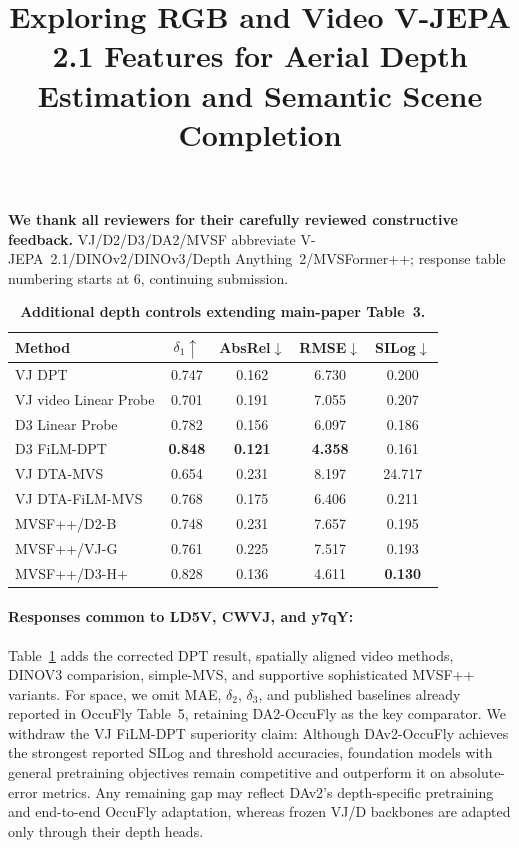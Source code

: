 \documentclass[10pt,twocolumn,letterpaper]{article}
\begin{document}
\title{Exploring RGB and Video V-JEPA 2.1 Features for Aerial Depth Estimation and Semantic Scene Completion}
\maketitle
\thispagestyle{empty}
\appendix

\noindent\textbf{We thank all reviewers for their carefully reviewed constructive feedback.}
VJ/D2/D3/DA2/MVSF abbreviate V-JEPA~2.1/DINOv2/DINOv3/Depth Anything~2/MVSFormer++;
response table numbering starts at 6, continuing submission.
\begin{table}[t]
  \centering
  \caption{\textbf{Additional depth controls extending main-paper Table~3.}}
  \label{tab:depth_evaluation}
  \footnotesize
  \setlength{\tabcolsep}{2.5pt}
  \begin{tabular}{@{}lcccc@{}}
    \toprule
    Method & $\delta_1\uparrow$ & AbsRel$\downarrow$ & RMSE$\downarrow$ & SILog$\downarrow$ \\
    \midrule
    VJ DPT          & 0.747 & 0.162 & 6.730 & 0.200 \\
    VJ video Linear Probe              & 0.701 & 0.191 & 7.055 & 0.207 \\
    D3 Linear Probe                    & 0.782 & 0.156 & 6.097 & 0.186 \\
    D3 FiLM-DPT              & \textbf{0.848} & \textbf{0.121} & \textbf{4.358} & 0.161 \\
    VJ DTA-MVS     & 0.654 & 0.231 & 8.197 & 24.717 \\
    VJ DTA-FiLM-MVS          & 0.768 & 0.175 & 6.406 & 0.211 \\
    MVSF++/D2-B             & 0.748 & 0.231 & 7.657 & 0.195 \\
    MVSF++/VJ-G             & 0.761 & 0.225 & 7.517 & 0.193 \\
    MVSF++/D3-H+            & 0.828 & 0.136 & 4.611 & \textbf{0.130} \\
    \bottomrule
  \end{tabular}
\end{table}

\paragraph{Responses common to LD5V, CWVJ, and y7qY:}
Table~\ref{tab:depth_evaluation} adds the corrected DPT result, spatially aligned video methods, DINOV3 comparision, simple-MVS, and supportive sophisticated MVSF++ variants. For space, we omit MAE, $\delta_2$, $\delta_3$, and published baselines already reported in OccuFly Table~5, retaining DA2-OccuFly as the key comparator. We withdraw the VJ FiLM-DPT superiority claim: Although DAv2-OccuFly achieves the strongest reported SILog and threshold accuracies, foundation models with general pretraining objectives remain competitive and outperform it on absolute-error metrics. Any remaining gap may reflect DAv2’s depth-specific pretraining and end-to-end OccuFly adaptation, whereas frozen VJ/D backbones are adapted only through their depth heads.
\end{document}
